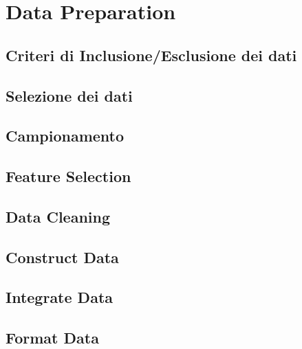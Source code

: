 \chapter{Data Preparation}

\section{Criteri di Inclusione/Esclusione dei dati}

\section{Selezione dei dati}

\section{Campionamento}

\section{Feature Selection}

\section{Data Cleaning}

\section{Construct Data}

\section{Integrate Data}

\section{Format Data}
